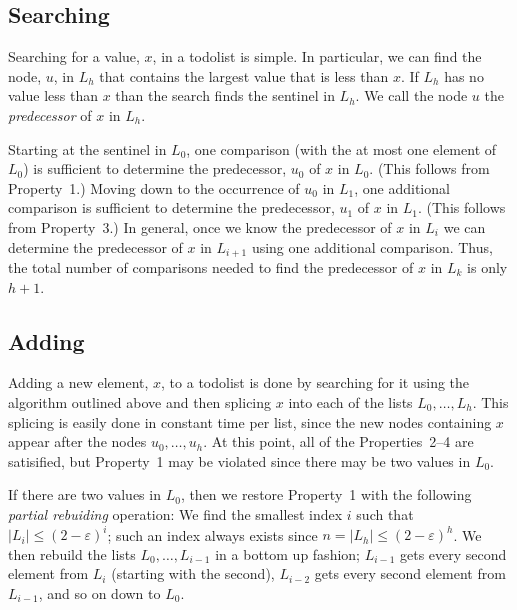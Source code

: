 \documentclass[lotsofwhite]{patmorin}
\newcommand{\eps}{\varepsilon}
\begin{document}
\subsection{Searching}

Searching for a value, $x$, in a todolist is simple. In particular, we
can find the node, $u$, in $L_h$ that contains the largest value that
is less than $x$. If $L_h$ has no value less than $x$ than the search
finds the sentinel in $L_h$.  We call the node $u$ the \emph{predecessor}
of $x$ in $L_h$.

Starting at the sentinel in $L_0$, one comparison (with the at most one
element of $L_0$) is sufficient to determine the predecessor, $u_0$ of $x$
in $L_0$. (This follows from Property~1.)  Moving down to the occurrence
of $u_0$ in $L_1$, one additional comparison is sufficient to determine
the predecessor, $u_1$ of $x$ in $L_1$. (This follows from Property~3.)
In general, once we know the predecessor of $x$ in $L_i$ we can determine
the predecessor of $x$ in $L_{i+1}$ using one additional comparison. Thus,
the total number of comparisons needed to find the predecessor of $x$
in $L_k$ is only $h+1$.

\vspace{1ex}
\begin{algorithmic}
    \ENDIF
  \ENDFOR
\end{algorithmic}

\subsection{Adding}

Adding a new element, $x$, to a todolist is done by searching for it
using the algorithm outlined above and then splicing $x$ into each of
the lists $L_0,\ldots,L_h$.  This splicing is easily done in constant
time per list, since the new nodes containing $x$ appear after the nodes
$u_0,\ldots,u_h$.  At this point, all of the Properties~2--4 are satisified,
but Property~1 may be violated since there may be two values in $L_0$.

If there are two values in $L_0$, then we restore Property~1 with the
following \emph{partial rebuiding} operation: We find the smallest index
$i$ such that $|L_i|\le (2-\eps)^i$; such an index always exists since
$n=|L_h|\le(2-\eps)^h$.  We then rebuild the lists $L_{0},\ldots,L_{i-1}$
in a bottom up fashion; $L_{i-1}$ gets every second element from $L_i$
(starting with the second), $L_{i-2}$ gets every second element from
$L_{i-1}$, and so on down to $L_0$.
\end{document}
